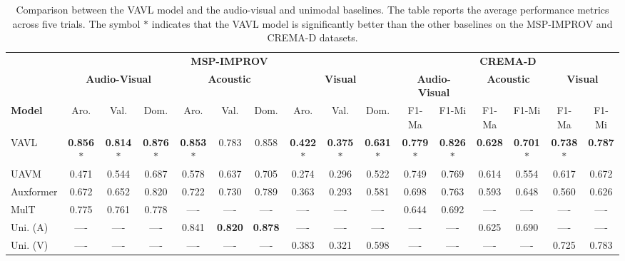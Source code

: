 \documentclass{article}
\begin{document}
\begin{table*}[ht]
\captionsetup{justification=centering}
\caption{Comparison between the VAVL model and the audio-visual and unimodal baselines. The table reports the average performance metrics across five trials. The symbol  $\ast$ indicates that the VAVL model is significantly better than the other baselines on the MSP-IMPROV and CREMA-D datasets. }
\label{tab:performances}
\centering
\setlength\tabcolsep{.85pt}
\begin{tabular*}{\textwidth}{@{\extracolsep{\fill}}l|*{9}{c}|*{6}{c}}
\toprule
& \multicolumn{9}{c|}{\textbf{MSP-IMPROV}} & \multicolumn{6}{c}{\textbf{CREMA-D}} \\
\cmidrule(lr){2-10} \cmidrule(lr){11-16}
 & \multicolumn{3}{c}{\textbf{Audio-Visual}} & \multicolumn{3}{c}{\textbf{Acoustic}} & \multicolumn{3}{c|}{\textbf{Visual}} & \multicolumn{2}{c}{\textbf{Audio-Visual}} & \multicolumn{2}{c}{\textbf{Acoustic}} & \multicolumn{2}{c}{\textbf{Visual}} \\
\cmidrule(lr){2-4} \cmidrule(lr){5-7} \cmidrule(lr){8-10} \cmidrule(lr){11-12} \cmidrule(lr){13-14} \cmidrule(lr){15-16} 
 \textbf{Model} & Aro. & Val. & Dom. & Aro. & Val. & Dom. & Aro. & Val. & Dom. & F1-Ma & F1-Mi & F1-Ma & F1-Mi & F1-Ma & F1-Mi \\
\midrule
VAVL & \textbf{0.856}$\ast$ & \textbf{0.814}$\ast$ & \textbf{0.876}$\ast$ & \textbf{0.853}$\ast$ & 0.783 & 0.858 & \textbf{0.422}$\ast$ & \textbf{0.375}$\ast$ & \textbf{0.631}$\ast$ & \textbf{0.779}$\ast$ & \textbf{0.826}$\ast$ & \textbf{0.628} & \textbf{0.701}$\ast$ & \textbf{0.738}$\ast$ & \textbf{0.787} \\
UAVM & 0.471 & 0.544 & 0.687 & 0.578 & 0.637 & 0.705 & 0.274 & 0.296 & 0.522 & 0.749 & 0.769 & 0.614 & 0.554 & 0.617 & 0.672 \\
Auxformer & 0.672 & 0.652 & 0.820 & 0.722 & 0.730 & 0.789 & 0.363 & 0.293 & 0.581 & 0.698 & 0.763 & 0.593 & 0.648 & 0.560 & 0.626 \\
MulT & 0.775 & 0.761 & 0.778 & ---- & ---- & ---- & ---- & ---- & ---- & 0.644 & 0.692 & ---- & ---- & ---- & ----  \\
Uni. (A) & ---- & ---- & ---- & 0.841 & \textbf{0.820} & \textbf{0.878} & ---- & ---- & ---- & ---- & ---- & 0.625 & 0.690 & ---- & ----  \\
Uni. (V) & ---- & ---- & ---- & ---- & ---- & ---- & 0.383 & 0.321 & 0.598 & ---- & ---- & ---- & ---- & 0.725 & 0.783 \\
\bottomrule
\end{tabular*}
\end{table*}
\end{document}
